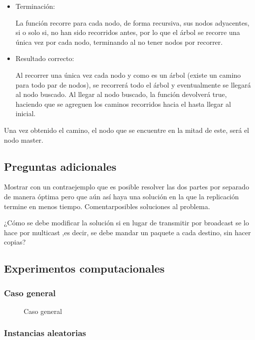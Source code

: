 \documentclass[a4paper, 10pt, twoside]{article}
\newcommand{\dosgraficos}[2]{
    \newcommand{\separacion}{-2.2em}
    \vspace{\separacion}
    
    \vspace{\separacion}
    
}
\begin{document}
\begin{itemize}
\item Terminación:

La función recorre para cada nodo, de forma recursiva, sus nodos adyacentes, si o solo si, no han sido recorridos antes, por lo que el árbol se recorre una única vez por cada nodo, terminando al no tener nodos por recorrer.

\item  Resultado correcto:

Al recorrer una única vez cada nodo y como es un árbol (existe un camino para todo par de nodos), se recorrerá todo el árbol y eventualmente se llegará al nodo buscado. Al llegar al nodo buscado, la función devolverá true, haciendo que se agreguen los caminos recorridos hacia el hasta llegar al inicial.
\end{itemize}

Una vez obtenido el camino, el nodo que se encuentre en la mitad de este, será el nodo master.

\subsection{Preguntas adicionales}
Mostrar con un contraejemplo que es posible resolver las dos partes por separado de manera óptima pero que aún así haya una solución en la que la replicación termine en menos tiempo. Comentarposibles soluciones al problema.


¿Cómo se debe modificar la solución si en lugar de transmitir por broadcast se lo hace por
multicast ,es decir, se debe mandar un paquete a cada destino, sin hacer copias?


\subsection{Experimentos computacionales}


\subsubsection{Caso general}

\begin{figure}[H]
  \centering
  \dosgraficos{problema2-caso-general}
              {problema2-caso-general-n}
  \caption{Caso general}
\end{figure}


\subsubsection{Instancias aleatorias}
\end{document}
